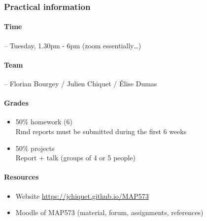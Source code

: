 \documentclass{beamer}\usepackage[]{graphicx}\usepackage[]{color}
\begin{document}
\begin{frame}
  \frametitle{Practical information}
  
  \paragraph{Time} -- Tuesday, 1.30pm - 6pm (zoom essentially\dots)

  \vfill

  \paragraph{Team} -- Florian Bourgey / Julien Chiquet / Élise Dumas

  \vfill
  
  \paragraph{Grades}
    \begin{itemize}
      \item  50\% homework (6) \\
      Rmd reports must be submitted during the first 6 weeks
      \item  50\% projects \\
      Report + talk (groups of 4 or 5 people)
    \end{itemize}

  \vfill

  \paragraph{Resources}
    \begin{itemize}
      \item Website \url{https://jchiquet.github.io/MAP573}
      \item Moodle of MAP573 (material, forum, assignments, references)
    \end{itemize}

\end{frame}
\end{document}
